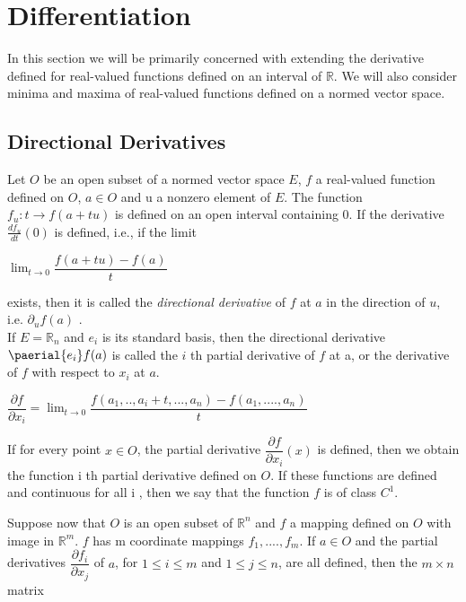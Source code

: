 \documentclass[12 pt]{article}
\theoremstyle{definition}
\theoremstyle{remark}
\newcommand{\R}{\mathbb{R}}
\begin{document}
\newpage
\section{Differentiation}
\normalfont
In this section we will be primarily concerned with extending the derivative defined
for real-valued functions defined on an interval of $\R$. We will also consider minima
and maxima of real-valued functions defined on a normed vector space.

\subsection{Directional Derivatives}

Let $O$ be an open subset of a normed vector space $E$, $f$ a real-valued function
defined on $O$, $a \in O$ and u a nonzero element of $E$. The function $f_{u}:t\rightarrow f(a +tu)$ is defined on an open interval containing 0. If the derivative $\frac{df_{u}}{dt}(0)$ is defined, i.e., if the limit
\begin{center}
$\lim_{t\to 0} \dfrac{f(a+tu)-f(a)}{t}$
\end{center}
exists, then it is called the \textit{directional derivative} of $f$ at $a$ in the direction of $u$, i.e. $\partial_{u}f(a)$ . \\

If $E = \R_{n}$ and $e_{i}$ is its standard basis, then the directional derivative $\paerial{e_{i}}f(a)$ is called the $i$ th partial derivative of $f$ at a, or the derivative of $f$ with respect to $x_{i}$ at $a$.

\begin{center}
$\dfrac{\partial f}{\partial{x_{i}}} = \lim_{t \to 0} \dfrac{f(a_{1},..,a_{i} + t,...,a_{n}) - f(a_{1},....,a_{n})}{t}$
\end{center}

If for every point $x \in O$, the partial derivative $\dfrac{\partial f}{\partial x_{i}} (x) $ is defined, then we obtain the function i th partial derivative defined on $O$. If these functions are defined and continuous for all i , then we say that the function $f$ is of class $ C^{1} $.


Suppose now that $O$ is an open subset of $\R^n$ and $f$ a mapping defined on $O$ with image in $\R^m$. $f$ has m coordinate mappings $f_1,...., f_m$. If $a \in O$ and the partial derivatives $\dfrac{\partial f_i}{\partial x_j} $ of $a$, for $1 \leq i \leq m$ and $1 \leq j \leq n$, are all defined, then the $m \times n $ matrix
\end{document}
